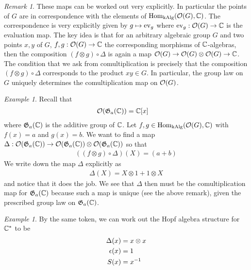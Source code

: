 \documentclass{amsart}
\numberwithin{equation}{section}
\theoremstyle{plain} %
\theoremstyle{definition}
\theoremstyle{remark}
\newtheorem{remark}[equation]{Remark}
\newtheorem{example}[equation]{Example}
\begin{document}
\begin{remark}
	These maps can be worked out very explicitly. In particular the points of $G$ are in correspondence with the elements of $\operatorname{Hom}_{\operatorname{kAlg}}({\mathcal{O}}(G),\mathbb{C})$.
	The correspondence is very explicitly given by $g\mapsto \operatorname{ev}_g$ where $\operatorname{ev}_g: {\mathcal{O}}(G)\to \mathbb{C}$ is the evaluation map.
	The key idea is that for an arbitrary algebraic group $G$ and two points $x,y$ of $G$,
	$f,g: {\mathcal{O}}(G)\to \mathbb{C}$ the corresponding morphisms of $\mathbb{C}$-algebras, then the composition $(f\otimes g)\circ \Delta$ is again a map ${\mathcal{O}}(G)\to {\mathcal{O}}(G)\otimes {\mathcal{O}}(G)\to \mathbb{C}$.
	The condition that we ask from comultiplication is precisely that the composition $(f\otimes g)\circ \Delta$
	corresponds to the product $xy\in G$. In particular, the group law on $G$ uniquely determines the comultiplication map on ${\mathcal{O}}(G)$.
\end{remark}

\begin{example}
	Recall that
	\begin{align*}
		{\mathcal{O}}(\mathfrak{G}_a(\mathbb{C})) & = \mathbb{C}[x]
	\end{align*} where $\mathfrak{G}_a(\mathbb{C})$ is the additive group of $\mathbb{C}$.
	Let $f,g\in \operatorname{Hom}_{\operatorname{kAlg}}({\mathcal{O}}(G),\mathbb{C})$ with $f(x) = a$ and $g(x) = b$.
	We want to find a map $\Delta: {\mathcal{O}}(\mathfrak{G}_a(\mathbb{C}))\to {\mathcal{O}}(\mathfrak{G}_a(\mathbb{C}))\otimes {\mathcal{O}}(\mathfrak{G}_a(\mathbb{C}))$ so that
	\begin{align*}
		((f\otimes g)\circ \Delta)(X) = (a+b)
	\end{align*}
	We write down the map $\Delta$ explicitly as
	\begin{align*}
		\Delta(X) = X\otimes 1 + 1\otimes X
	\end{align*} and notice that it does the job. We see that $\Delta$ then must be the
	comultiplication map for $\mathfrak{G}_a(\mathbb{C})$ because such a map is unique (see the above remark), given the prescribed group law on $\mathfrak{G}_a(\mathbb{C})$.
\end{example}

\begin{example}
	By the same token, we can work out the Hopf algebra structure for $\mathbb{C}^*$ to be
	\begin{align*}
		\Delta(x)   & = x\otimes x \\
		\epsilon(x) & = 1          \\
		S(x)        & = {x}^{-1}
	\end{align*}
\end{example}
\end{document}
